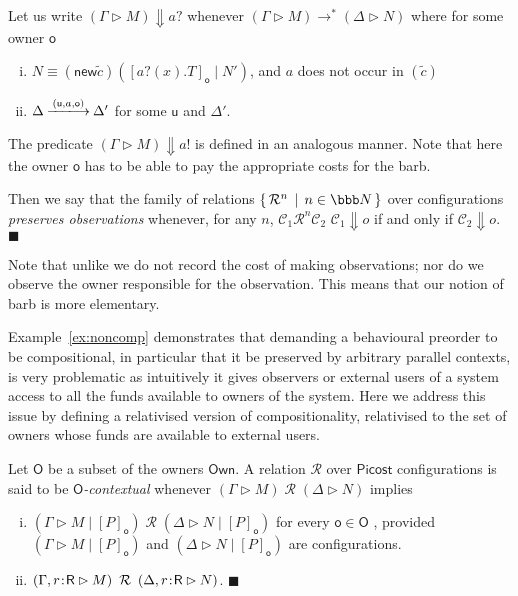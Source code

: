 \documentclass{LMCS}
\newcommand{\pfn}[1]{\mathsf{#1}}  \newcommand{\cfn}[1]{\mathsf{#1}}  \newcommand{\ownfnt}[1]{{\mathsf{#1}}}
\newcommand{\picost}{\ensuremath{\pfn{Picost}}\xspace}
\newcommand{\with}{\mathbin \rhd}
\newcommand{\Own}{\ensuremath{\pfn{Own}}\xspace}
\newcommand{\cancom}[3]{({\ownfnt{#1}},{#2},{\ownfnt{#3}}) \xspace}
\newcommand{\nats}{\ensuremath{\bbb N}\xspace}
\newcommand{\ownO}{ {\ownfnt O}}
\newcommand{\setof}[2]{\{ \, #1 \, \mid \, #2 \, \}}\newcommand{\sset}[1]{\{ {#1}  \}  }
\newcommand{\typeletter}[1]{{\mathsf{#1}}}
\newcommand{\tR}{\typeletter{R}}
\newcommand{\calR}{\mathbin{\mathcal{R}}}
\newcommand{\calC}{\mathcal{C}}
\newcommand{\pa}[1]{\!\left(#1\right)}
\newcommand{\Cassoc}[2]{ {{#1}\kern -0.2em : \kern -0.2em {#2}}}
\newcommand{\CnewNT}[1]{(\pfn{new} {#1})}
\newcommand{\Cpar}{\mathbin{|}}
\newcommand{\Cloc}[2]{[#1]_{\ownfnt{#2}}}
\newcommand{\ar}[1]{\mathbin{\xlongrightarrow{ #1}}}
\newcommand{\smalleval}{\longrightarrow}  \newcommand{\csmalleval}[1]{\longrightarrow^{#1}}
\newcommand{\structeq}{\equiv}
\newcommand{\EndDefBox}{\null\hfill$\blacksquare$}
\newcommand{\boxHere}{\global\let\EndProof\empty\EndDefBox}
\begin{document}
\begin{defi}
[Observations] 
Let us write $(\Gamma \with M) \Downarrow a?$ whenever
$(\Gamma \with M) \smalleval^* (\Delta \with N)$ where 
for some owner $\ownfnt o$
\begin{enumerate}[(i)]
\item $N \structeq \CnewNT{\tilde{c}}(\Cloc{a?\pa{x}. T}{o} \Cpar N')$, 
and $a$ does not occur in $(\tilde{c})$

\item $\Delta \ar{\cancom{u}{a}{o}} \Delta'$ for some $\ownfnt u$ and $\Delta'$.
\end{enumerate}
The predicate $(\Gamma \with M) \Downarrow a!$ is defined in an
analogous manner.  Note that here the owner $\ownfnt o$ has to be able to pay
the appropriate costs for the barb. 

Then we say that the family of relations
$\setof{\calR^n}{ n \in \nats} $ over configurations \emph{preserves
  observations} whenever, for any $n$, $\calC_1 \calR^n \calC_2 $ 
$\calC_1 \Downarrow o$ if and only if $\calC_2 \Downarrow o$.
\boxHere
\end{defi}
\noindent
 Note
that unlike \cite{picost} we do not record the cost of making
observations; nor do we observe the owner responsible for the observation.
This means that our notion of barb is more elementary. 


Example~\ref{ex:noncomp} demonstrates that demanding a behavioural
preorder to be compositional, in particular that it be preserved by
arbitrary parallel contexts, is very problematic as intuitively it
gives observers or external users of a system access to all the funds available
to owners of the system. Here we address this issue by defining a relativised
version of compositionality, relativised to the set of owners whose funds are available 
to external users. 


\begin{defi}[$\ownO$-contextual]\label{def:contextual}
Let $\ownO$ be a subset of the owners $\Own$. A relation 
$\calR$ over \picost configurations is said to be 
\emph{$\ownO$-contextual} whenever
$(\Gamma \with M) \;\calR\; (\Delta \with N)$  implies 
\begin{enumerate}[(i)]
\item 
$(\Gamma \with M \Cpar \Cloc{P}{o} ) \;\calR\; (\Delta \with N \Cpar \Cloc{P}{o})$ for every 
${\ownfnt o} \in \ownO$ , provided 
$(\Gamma \with M \Cpar \Cloc{P}{o} )$ and $(\Delta \with N \Cpar \Cloc{P}{o})$ are configurations. 

\item $(\Gamma, \Cassoc{r}{\tR} \with M) \;\calR\; (\Delta, \Cassoc{r}{\tR}  \with N)$.
\boxHere
\end{enumerate}
\end{defi}
\end{document}

